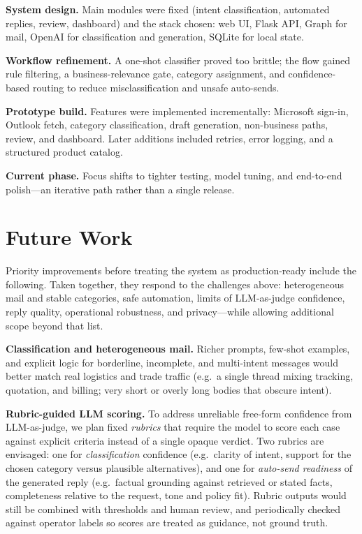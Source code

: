 \documentclass[12pt]{article}
\begin{document}
\textbf{System design.} Main modules were fixed (intent classification, automated replies, review, dashboard) and the stack chosen: web UI, Flask API, Graph for mail, OpenAI for classification and generation, SQLite for local state.

\textbf{Workflow refinement.} A one-shot classifier proved too brittle; the flow gained rule filtering, a business-relevance gate, category assignment, and confidence-based routing to reduce misclassification and unsafe auto-sends.

\textbf{Prototype build.} Features were implemented incrementally: Microsoft sign-in, Outlook fetch, category classification, draft generation, non-business paths, review, and dashboard. Later additions included retries, error logging, and a structured product catalog.

\textbf{Current phase.} Focus shifts to tighter testing, model tuning, and end-to-end polish---an iterative path rather than a single release.

\section{Future Work}

Priority improvements before treating the system as production-ready include the following. Taken together, they respond to the challenges above: heterogeneous mail and stable categories, safe automation, limits of LLM-as-judge confidence, reply quality, operational robustness, and privacy---while allowing additional scope beyond that list.

\textbf{Classification and heterogeneous mail.} Richer prompts, few-shot examples, and explicit logic for borderline, incomplete, and multi-intent messages would better match real logistics and trade traffic (e.g.\ a single thread mixing tracking, quotation, and billing; very short or overly long bodies that obscure intent).

\textbf{Rubric-guided LLM scoring.} To address unreliable free-form confidence from LLM-as-judge, we plan fixed \emph{rubrics} that require the model to score each case against explicit criteria instead of a single opaque verdict. Two rubrics are envisaged: one for \emph{classification} confidence (e.g.\ clarity of intent, support for the chosen category versus plausible alternatives), and one for \emph{auto-send readiness} of the generated reply (e.g.\ factual grounding against retrieved or stated facts, completeness relative to the request, tone and policy fit). Rubric outputs would still be combined with thresholds and human review, and periodically checked against operator labels so scores are treated as guidance, not ground truth.
\end{document}

